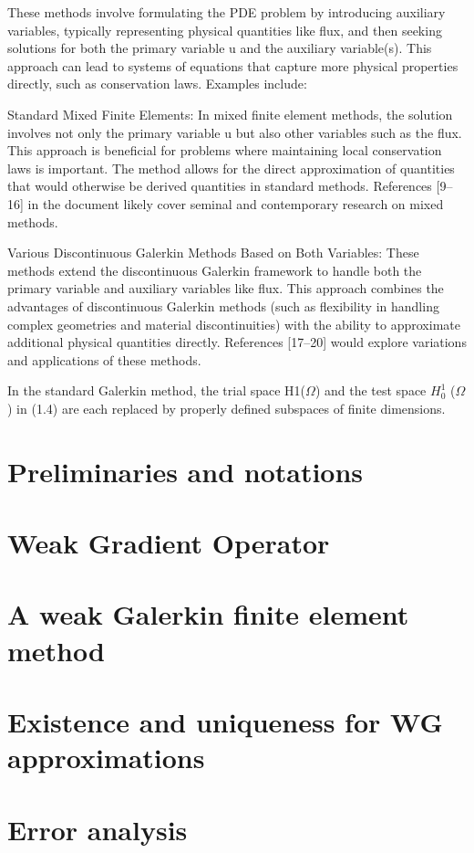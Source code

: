 \documentclass[a4paper,11pt]{article} %
\begin{document}
These methods involve formulating the PDE problem by introducing auxiliary variables, 
typically representing physical quantities like flux, and then seeking solutions for
both the primary variable u and the auxiliary variable(s). This approach can lead to 
systems of equations that capture more physical properties directly, such as conservation 
laws. Examples include:

Standard Mixed Finite Elements: In mixed finite element methods, the solution involves 
not only the primary variable u but also other variables such as the flux. This approach 
is beneficial for problems where maintaining local conservation laws is important. 
The method allows for the direct approximation of quantities that would otherwise 
be derived quantities in standard methods. References [9–16] in the document likely 
cover seminal and contemporary research on mixed methods.

Various Discontinuous Galerkin Methods Based on Both Variables: These methods extend 
the discontinuous Galerkin framework to handle both the primary variable and auxiliary 
variables like flux. This approach combines the advantages of discontinuous Galerkin 
methods (such as flexibility in handling complex geometries and material discontinuities) 
with the ability to approximate additional physical quantities directly. 
References [17–20] would explore variations and applications of these methods.

In the standard Galerkin method, the trial space H1($\Omega$) and the test 
space $H^1_0$ ($\Omega$) in (1.4) are each replaced by properly defined
subspaces of finite dimensions.

\section*{Preliminaries and notations}

\section*{Weak Gradient Operator}

\section*{A weak Galerkin finite element method}

\section*{Existence and uniqueness for WG approximations}

\section*{Error analysis}
\end{document}
